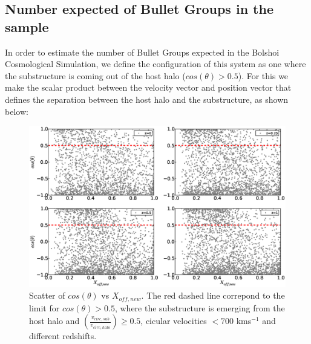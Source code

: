 \documentclass{emulateapj}
\begin{document}
\subsection{Number expected of Bullet Groups in the sample}


In order to estimate the number of Bullet Groups expected in the
Bolshoi Cosmological Simulation, we define the configuration of this system as one where the substructure is coming out of the host halo ($cos(\theta)>0.5$). For this 
we make the scalar product between the velocity vector and position vector that defines the separation between 
 the host halo and the substructure, as shown below: \\
 


\begin{figure}
\begin{center}
\includegraphics[width=1.0\textwidth]{Figures_eps/figure_8_1_nu=0.5_300kms_700kms.eps}
\end{center}
\caption{Scatter of $cos(\theta)$ vs $X_{off,new}$. The red dashed line correpond to the limit for $cos(\theta{})>0.5$,  
where the substructure is emerging from the host halo and  $\left(\frac{v_{circ,sub}}{v_{circ,halo}}\right)\geq0.5$, 
cicular velocities $<700$ kms$^{-1}$ and different redshifts.} 
\label{cos_theta}
\end{figure}
\end{document}
